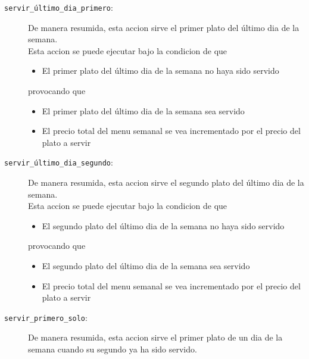 \begin{description}

  \item[\texttt{servir\_último\_dia\_primero}:]

    De manera resumida, esta accion
    sirve el primer plato del último dia de la semana.
    \\

    Esta accion se puede ejecutar
    bajo la condicion de que
    \begin{itemize}
      \item El primer plato del último dia de la semana no haya sido servido
    \end{itemize}
    provocando que
    \begin{itemize}
      \item El primer plato del último dia de la semana sea servido
      \item El precio total del menu semanal se vea incrementado por el precio 
        del plato a servir
    \end{itemize}

  \item[\texttt{servir\_último\_dia\_segundo}:]

    De manera resumida, esta accion
    sirve el segundo plato del último dia de la semana.
    \\

    Esta accion se puede ejecutar
    bajo la condicion de que
    \begin{itemize}
      \item El segundo plato del último dia de la semana no haya sido servido
    \end{itemize}
    provocando que
    \begin{itemize}
      \item El segundo plato del último dia de la semana sea servido
      \item El precio total del menu semanal se vea incrementado por el precio 
        del plato a servir
    \end{itemize}

  \item[\texttt{servir\_primero\_solo}:]

    De manera resumida, esta accion
    sirve el primer plato de un dia de la semana cuando su segundo
    ya ha sido servido.
    \\
    

\end{description}
